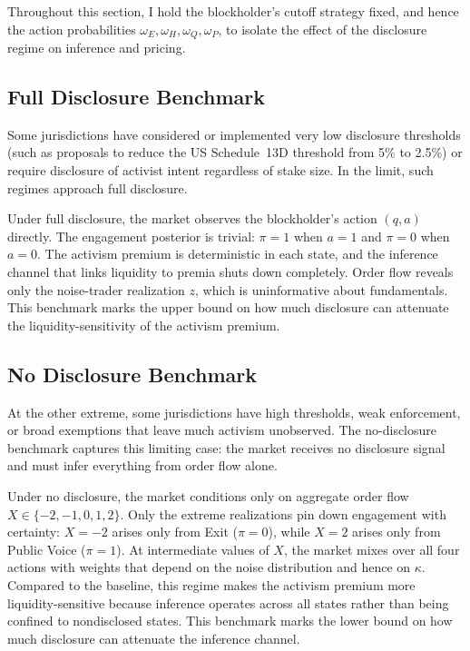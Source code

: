 \documentclass[11pt]{article}
\newcommand{\1}{\mathbf{1}}
\begin{document}
Throughout this section, I hold the blockholder's cutoff strategy fixed, and hence the action probabilities $\omega_E,\omega_H,\omega_Q,\omega_P$, to isolate the effect of the disclosure regime on inference and pricing.

%
\subsection{Full Disclosure Benchmark}
%

Some jurisdictions have considered or implemented very low disclosure thresholds (such as proposals to reduce the US Schedule~13D threshold from 5\% to 2.5\%) or require disclosure of activist intent regardless of stake size. In the limit, such regimes approach full disclosure.

Under full disclosure, the market observes the blockholder's action $(q,a)$ directly. The engagement posterior is trivial: $\pi=1$ when $a=1$ and $\pi=0$ when $a=0$. The activism premium is deterministic in each state, and the inference channel that links liquidity to premia shuts down completely. Order flow reveals only the noise-trader realization $z$, which is uninformative about fundamentals. This benchmark marks the upper bound on how much disclosure can attenuate the liquidity-sensitivity of the activism premium.

%
\subsection{No Disclosure Benchmark}
%

At the other extreme, some jurisdictions have high thresholds, weak enforcement, or broad exemptions that leave much activism unobserved. The no-disclosure benchmark captures this limiting case: the market receives no disclosure signal and must infer everything from order flow alone.

Under no disclosure, the market conditions only on aggregate order flow $X\in\{-2,-1,0,1,2\}$. Only the extreme realizations pin down engagement with certainty: $X=-2$ arises only from Exit ($\pi=0$), while $X=2$ arises only from Public Voice ($\pi=1$). At intermediate values of $X$, the market mixes over all four actions with weights that depend on the noise distribution and hence on $\kappa$. Compared to the baseline, this regime makes the activism premium more liquidity-sensitive because inference operates across all states rather than being confined to nondisclosed states. This benchmark marks the lower bound on how much disclosure can attenuate the inference channel.
\end{document}
